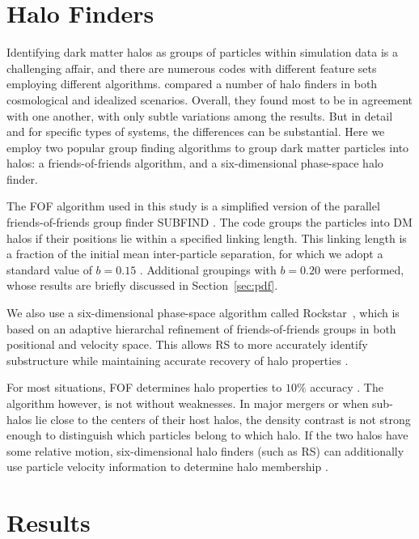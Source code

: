 \documentclass[useAMS, usenatbib]{mn2e}
\newcommand{\RS}{{\sc Rockstar}}
\begin{document}
\section{Halo Finders}
 \label{sec:halofinders}
Identifying dark matter halos as groups of particles within simulation data
is a challenging affair, and there are numerous codes
with different feature sets employing different algorithms.
\citet{MAD11} compared a number of halo finders in both cosmological
and idealized scenarios.  Overall, they found most to be in agreement
with one another, with only subtle variations among the results.
But in detail and for specific types of systems, the differences
can be substantial.
Here we employ two popular group finding algorithms to group
dark matter particles into halos: a friends-of-friends algorithm,
and a six-dimensional phase-space halo finder.

The FOF algorithm used in this study is a simplified version of the
parallel friends-of-friends group finder {\small SUBFIND}
\citep{Springel01}.  The code groups the particles into DM halos
if their positions lie within a specified linking length.  This
linking length is a fraction of the initial mean inter-particle
separation, for which we adopt a standard value of $b=0.15$
\citep{More11}.  Additional groupings with $b=0.20$ were performed,
whose results are briefly discussed in Section~\ref{sec:pdf}.

We also use a six-dimensional phase-space algorithm called 
\RS\ \citep[hereafter RS;][]{ROCKSTAR}, which is based on an
adaptive hierarchal refinement of friends-of-friends groups in both
positional and velocity space.  This allows RS to more accurately
identify substructure while maintaining accurate recovery of halo
properties \citep[see][for further details]{MAD11}.

For most situations, FOF determines halo properties to $10\%$
accuracy \citep{MAD11}.  The algorithm however, is not without
weaknesses.  In major mergers or when sub-halos lie close to the
centers of their host halos, the density contrast is not strong
enough to distinguish which particles belong to which halo.  If the
two halos have some relative motion, six-dimensional halo finders
(such as RS) can additionally use particle velocity information to
determine halo membership \citep{ROCKSTAR}.


\section{Results}
\label{sec:results}
\end{document}
